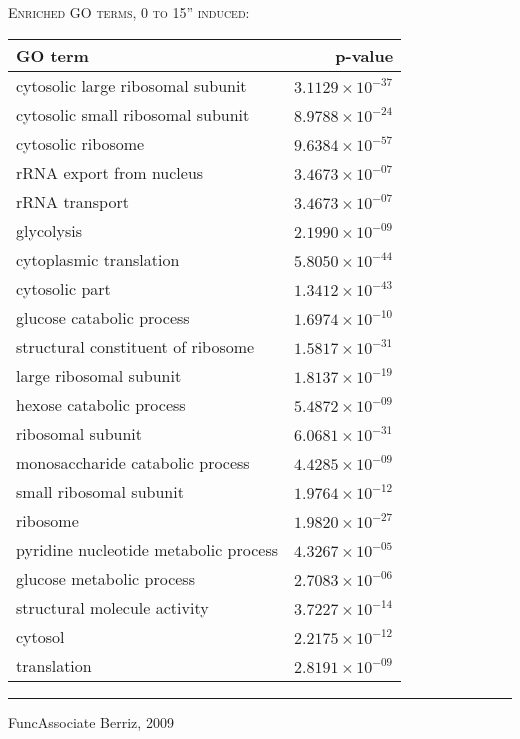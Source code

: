 \documentclass{beamer}
\begin{document}
\begin{frame}
    \textsc{Enriched GO terms, 0 to 15'' induced:}

    \begin{table}[ht]
    \centering
    \scriptsize
        \begin{tabular}{lr}
        \toprule
        \textbf{GO term} & \textbf{p-value}\\ 
        \midrule
        cytosolic large ribosomal subunit & $3.1129 \times 10^{-37}$ \\
        cytosolic small ribosomal subunit & $8.9788 \times 10^{-24}$ \\
        cytosolic ribosome & $9.6384 \times 10^{-57}$ \\
        rRNA export from nucleus & $3.4673 \times 10^{-07}$ \\
        rRNA transport & $3.4673 \times 10^{-07}$ \\
        glycolysis & $2.1990 \times 10^{-09}$ \\
        cytoplasmic translation & $5.8050 \times 10^{-44}$ \\
        cytosolic part & $1.3412 \times 10^{-43}$ \\
        glucose catabolic process & $1.6974 \times 10^{-10}$ \\
        structural constituent of ribosome & $1.5817 \times 10^{-31}$ \\
        large ribosomal subunit & $1.8137 \times 10^{-19}$ \\
        hexose catabolic process & $5.4872 \times 10^{-09}$ \\
        ribosomal subunit & $6.0681 \times 10^{-31}$ \\
        monosaccharide catabolic process & $4.4285 \times 10^{-09}$ \\
        small ribosomal subunit & $1.9764 \times 10^{-12}$ \\
        ribosome & $1.9820 \times 10^{-27}$ \\
        pyridine nucleotide metabolic process & $4.3267 \times 10^{-05}$ \\
        glucose metabolic process & $2.7083 \times 10^{-06}$ \\
        structural molecule activity & $3.7227 \times 10^{-14}$ \\
        cytosol & $2.2175 \times 10^{-12}$ \\
        translation & $2.8191 \times 10^{-09}$ \\
        \bottomrule
        \end{tabular}
    \end{table}
    
    \scriptsize
    \rule{\linewidth}{0.5pt}
    {FuncAssociate \hfill Berriz, 2009}
\end{frame}
\end{document}
